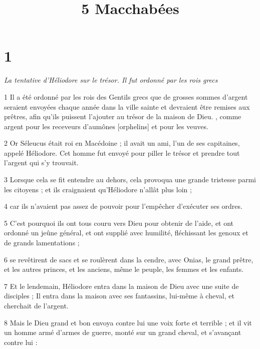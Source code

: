 

\title{5 Macchabées}


\chapter{1}

\par \textit{La tentative d'Héliodore sur le trésor. Il fut ordonné par les rois grecs}

\par 1 Il a été ordonné par les rois des Gentils grecs que de grosses sommes d'argent seraient envoyées chaque année dans la ville sainte et devraient être remises aux prêtres, afin qu'ils puissent l'ajouter au trésor de la maison de Dieu. , comme argent pour les receveurs d'aumônes [orphelins] et pour les veuves.

\par 2 Or Séleucus était roi en Macédoine ; il avait un ami, l'un de ses capitaines, appelé Héliodore. Cet homme fut envoyé pour piller le trésor et prendre tout l'argent qui s'y trouvait.

\par 3 Lorsque cela se fit entendre au dehors, cela provoqua une grande tristesse parmi les citoyens ; et ils craignaient qu'Héliodore n'allât plus loin ;

\par 4 car ils n'avaient pas assez de pouvoir pour l'empêcher d'exécuter ses ordres.

\par 5 C'est pourquoi ils ont tous couru vers Dieu pour obtenir de l'aide, et ont ordonné un jeûne général, et ont supplié avec humilité, fléchissant les genoux et de grands lamentations ;

\par 6 se revêtirent de sacs et se roulèrent dans la cendre, avec Onias, le grand prêtre, et les autres princes, et les anciens, même le peuple, les femmes et les enfants.

\par 7 Et le lendemain, Héliodore entra dans la maison de Dieu avec une suite de disciples ; Il entra dans la maison avec ses fantassins, lui-même à cheval, et cherchait de l'argent.

\par 8 Mais le Dieu grand et bon envoya contre lui une voix forte et terrible ; et il vit un homme armé d'armes de guerre, monté sur un grand cheval, et s'avançant contre lui :

